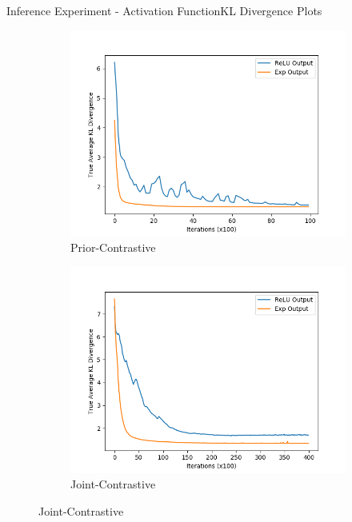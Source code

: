 \documentclass{beamer}
\begin{document}
\begin{frame}{Inference Experiment - Activation Function}{KL Divergence Plots}
\begin{figure}
\begin{subfigure}{0.49\textwidth}
\includegraphics[width=\linewidth]{truklmins/PCKLvsPCKLEXP.png}
\caption{Prior-Contrastive}
\end{subfigure}
\begin{subfigure}{0.49\textwidth}
\includegraphics[width=\linewidth]{truklmins/JCKLvsJCKLEXP.png}
\caption{Joint-Contrastive}
\end{subfigure}
\end{figure}
\end{frame}
\end{document}
